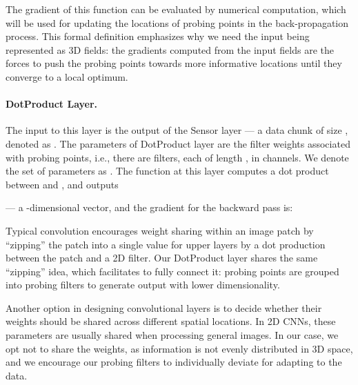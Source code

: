 \documentclass{article}
\begin{document}
The gradient of this function  can be evaluated by numerical computation, which will be used for updating the locations of probing points in the back-propagation process. This formal definition emphasizes why we need the input being represented as 3D fields: the gradients computed from the input fields are the forces to push the probing points towards more informative locations until they converge to a local optimum.

\paragraph{DotProduct Layer.} The input to this layer is the output of the Sensor layer --- a data chunk of size , denoted as . The parameters of DotProduct layer are the filter weights associated with probing points, i.e., there are  filters, each of length , in  channels. We denote the set of parameters as . The function at this layer computes a dot product between  and , and outputs

--- a -dimensional vector, and the gradient for the backward pass is:


Typical convolution encourages weight sharing within an image patch by ``zipping'' the patch into a single value for upper layers by a dot production between the patch and a 2D filter. Our DotProduct layer shares the same ``zipping'' idea, which facilitates to fully connect it: probing points are grouped into probing filters to generate output with lower dimensionality. 

Another option in designing convolutional layers is to decide whether their weights should be shared across different spatial locations. In 2D CNNs, these parameters are usually shared when processing general images. In our case, we opt not to share the weights, as information is not evenly distributed in 3D space, and we encourage our probing filters to individually deviate for adapting to the data.
\end{document}

